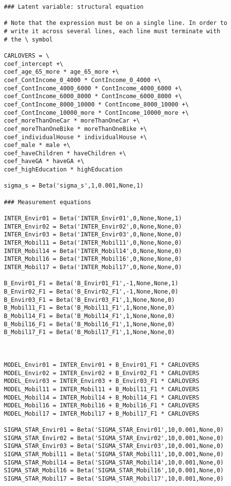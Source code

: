 \documentclass[12pt,a4paper]{article}
\begin{document}
\begin{lstlisting}[style=numbers]
### Latent variable: structural equation

# Note that the expression must be on a single line. In order to 
# write it across several lines, each line must terminate with 
# the \ symbol

CARLOVERS = \
coef_intercept +\
coef_age_65_more * age_65_more +\
coef_ContIncome_0_4000 * ContIncome_0_4000 +\
coef_ContIncome_4000_6000 * ContIncome_4000_6000 +\
coef_ContIncome_6000_8000 * ContIncome_6000_8000 +\
coef_ContIncome_8000_10000 * ContIncome_8000_10000 +\
coef_ContIncome_10000_more * ContIncome_10000_more +\
coef_moreThanOneCar * moreThanOneCar +\
coef_moreThanOneBike * moreThanOneBike +\
coef_individualHouse * individualHouse +\
coef_male * male +\
coef_haveChildren * haveChildren +\
coef_haveGA * haveGA +\
coef_highEducation * highEducation

sigma_s = Beta('sigma_s',1,0.001,None,1)

### Measurement equations

INTER_Envir01 = Beta('INTER_Envir01',0,None,None,1)
INTER_Envir02 = Beta('INTER_Envir02',0,None,None,0)
INTER_Envir03 = Beta('INTER_Envir03',0,None,None,0)
INTER_Mobil11 = Beta('INTER_Mobil11',0,None,None,0)
INTER_Mobil14 = Beta('INTER_Mobil14',0,None,None,0)
INTER_Mobil16 = Beta('INTER_Mobil16',0,None,None,0)
INTER_Mobil17 = Beta('INTER_Mobil17',0,None,None,0)

B_Envir01_F1 = Beta('B_Envir01_F1',-1,None,None,1)
B_Envir02_F1 = Beta('B_Envir02_F1',-1,None,None,0)
B_Envir03_F1 = Beta('B_Envir03_F1',1,None,None,0)
B_Mobil11_F1 = Beta('B_Mobil11_F1',1,None,None,0)
B_Mobil14_F1 = Beta('B_Mobil14_F1',1,None,None,0)
B_Mobil16_F1 = Beta('B_Mobil16_F1',1,None,None,0)
B_Mobil17_F1 = Beta('B_Mobil17_F1',1,None,None,0)



MODEL_Envir01 = INTER_Envir01 + B_Envir01_F1 * CARLOVERS
MODEL_Envir02 = INTER_Envir02 + B_Envir02_F1 * CARLOVERS
MODEL_Envir03 = INTER_Envir03 + B_Envir03_F1 * CARLOVERS
MODEL_Mobil11 = INTER_Mobil11 + B_Mobil11_F1 * CARLOVERS
MODEL_Mobil14 = INTER_Mobil14 + B_Mobil14_F1 * CARLOVERS
MODEL_Mobil16 = INTER_Mobil16 + B_Mobil16_F1 * CARLOVERS
MODEL_Mobil17 = INTER_Mobil17 + B_Mobil17_F1 * CARLOVERS

SIGMA_STAR_Envir01 = Beta('SIGMA_STAR_Envir01',10,0.001,None,0)
SIGMA_STAR_Envir02 = Beta('SIGMA_STAR_Envir02',10,0.001,None,0)
SIGMA_STAR_Envir03 = Beta('SIGMA_STAR_Envir03',10,0.001,None,0)
SIGMA_STAR_Mobil11 = Beta('SIGMA_STAR_Mobil11',10,0.001,None,0)
SIGMA_STAR_Mobil14 = Beta('SIGMA_STAR_Mobil14',10,0.001,None,0)
SIGMA_STAR_Mobil16 = Beta('SIGMA_STAR_Mobil16',10,0.001,None,0)
SIGMA_STAR_Mobil17 = Beta('SIGMA_STAR_Mobil17',10,0.001,None,0)



\end{lstlisting}
\end{document}
